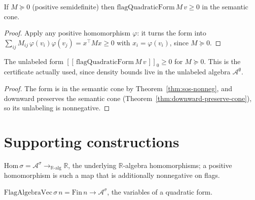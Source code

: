 \begin{theorem}
  \label{thm:sos-nonneg}
  \leanok
  If $M \succeq 0$ (positive semidefinite) then
  $\mathrm{flagQuadraticForm}\,M\,v \ge 0$ in the semantic cone.
\end{theorem}
\begin{proof}\leanok
  Apply any positive homomorphism $\varphi$: it turns the form into
  $\sum_{ij} M_{ij}\,\varphi(v_i)\varphi(v_j) = x^\top M x \ge 0$ with
  $x_i = \varphi(v_i)$, since $M \succeq 0$.
\end{proof}

\begin{theorem}
  \label{thm:sos-downward-nonneg}
  \leanok
  The unlabeled form $[\![\,\mathrm{flagQuadraticForm}\,M\,v\,]\!]_0 \ge 0$ for
  $M \succeq 0$. This is the certificate actually used, since density bounds live
  in the unlabeled algebra $\mathcal{A}^\emptyset$.
\end{theorem}
\begin{proof}\leanok
  The form is in the semantic cone by Theorem~\ref{thm:sos-nonneg}, and downward
  preserves the semantic cone (Theorem~\ref{thm:downward-preserve-cone}), so its
  unlabeling is nonnegative.
\end{proof}

\section{Supporting constructions}

\begin{definition}
  \label{def:hom}
  \leanok
  $\mathrm{Hom}\,\sigma = \mathcal{A}^\sigma \to_{\mathbb{R}\text{-alg}}
  \mathbb{R}$, the underlying $\mathbb{R}$-algebra homomorphisms; a positive
  homomorphism is such a map that is additionally nonnegative on flags.
\end{definition}

\begin{definition}
  \label{def:flag-algebra-vec}
  \leanok
  $\mathrm{FlagAlgebraVec}\,\sigma\,n = \mathrm{Fin}\,n \to \mathcal{A}^\sigma$,
  the variables of a quadratic form.
\end{definition}

